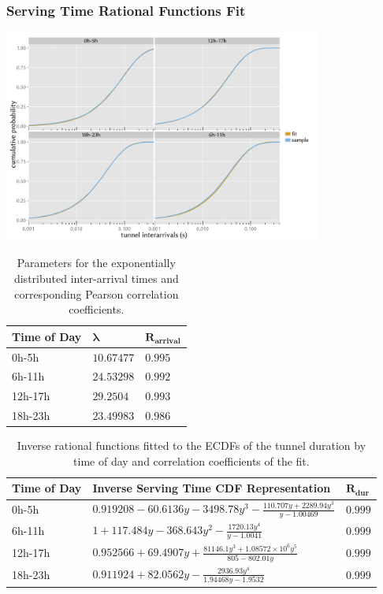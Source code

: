 \documentclass{beamer}
\begin{document}
\begin{frame}
	\frametitle{Serving Time Rational Functions Fit}

	\begin{center}
		\includegraphics[height=7cm]{extras/R-IAT-active-fit-cdf-facets.png}
	\end{center}
\end{frame}


\begin{frame}
	\begin{table}
	\tiny
	\caption{Parameters for the exponentially distributed inter-arrival times and corresponding Pearson correlation coefficients.}
		\centering
		\begin{tabu}{X[0.9,l]X[r]X[r]} 
		\toprule
		\textbf{Time of Day} & $\mathbf{\lambda}$ & $\mathbf{R_{arrival}}$\\ 
		\midrule
		0h-5h   & $10.67477$ & $0.995$ \\
		6h-11h  & $24.53298$ & $0.992$ \\
		12h-17h & $29.2504$  & $0.993$ \\
		18h-23h & $23.49983$ & $0.986$ \\
		\bottomrule
		\end{tabu}
	\end{table}

	\begin{table}
	\tiny
	\caption{Inverse rational functions fitted to the ECDFs of the tunnel duration by time of day and correlation coefficients of the fit.}
		\centering
		\begin{tabu}{X[1.1,l]X[4.5,r]X[r]} 
		\toprule
		\textbf{Time of Day} & \textbf{Inverse Serving Time CDF Representation} & $\mathbf{R_{dur}}$\\ 
		\midrule
		0h-5h & $0.919208 - 60.6136y - 3498.78y^3 - \frac{110.707y + 2289.94y^3}{y - 1.00469}$ &  $0.999$ \\
		6h-11h & $1 + 117.484y - 368.643y^2 - \frac{1720.13y^4}{y - 1.0041}$ & $0.999$ \\
		12h-17h & $0.952566 + 69.4907y + \frac{81146.1y^3 + 1.08572\times10^6y^5}{805 - 802.01y}$ & $0.999$ \\
		18h-23h & $0.911924 + 82.0562y - \frac{2936.93y^4}{1.94468y - 1.9532}$ & $0.999$ \\
		\bottomrule
		\end{tabu}
	\end{table}
\end{frame}
\end{document}
